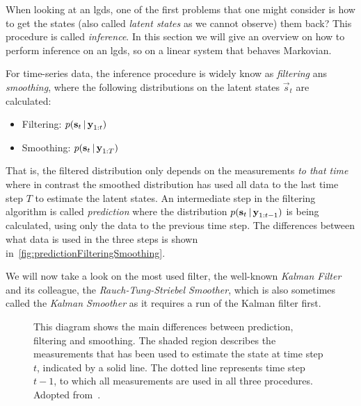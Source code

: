 	When looking at an \ac{lgds}, one of the first problems that one might consider is how to get the states (also called \emph{latent states} as we cannot observe) them back? This procedure is called \emph{inference}. In this section we will give an overview on how to perform inference on an \ac{lgds}, so on a linear system that behaves Markovian.

	For time-series data, the inference procedure is widely know as \emph{filtering} ans \emph{smoothing}, where the following distributions on the latent states \( \vec{s}_t \) are calculated:
	\begin{itemize}
		\item Filtering: \tabto{2.5cm} \( p(\boldsymbol{\mathrm{s}}_t \,\vert\, \boldsymbol{\mathrm{y}}_{1:t}) \)
		\item Smoothing: \tabto{2.5cm} \( p(\boldsymbol{\mathrm{s}}_t \,\vert\, \boldsymbol{\mathrm{y}}_{1:T}) \)
	\end{itemize}
	That is, the filtered distribution only depends on the measurements \emph{to that time} where in contrast the smoothed distribution has used all data to the last time step \(T\) to estimate the latent states. An intermediate step in the filtering algorithm is called \emph{prediction} where the distribution \( p(\boldsymbol{\mathrm{s}}_t \,\vert\, \boldsymbol{\mathrm{y}}_{1:t - 1}) \) is being calculated, using only the data to the previous time step. The differences between what data is used in the three steps is shown in~\autoref{fig:predictionFilteringSmoothing}.

	We will now take a look on the most used filter, the well-known \emph{Kalman Filter} and its colleague, the \emph{Rauch-Tung-Striebel Smoother}, which is also sometimes called the \emph{Kalman Smoother} as it requires a run of the Kalman filter first.

	\begin{figure}
		\centering
		\tikzPredictionFilteringSmoothing
		\caption{This diagram shows the main differences between prediction, filtering and smoothing. The shaded region describes the measurements that has been used to estimate the state at time step \(t\), indicated by a solid line. The dotted line represents time step \(t - 1\), to which all measurements are used in all three procedures. \\ Adopted from~\cite{solinCubatureIntegrationMethods2010}.}
		\label{fig:predictionFilteringSmoothing}
	\end{figure}

